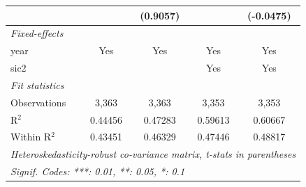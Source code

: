 \begin{tabular}{lcccc}
                     &                & (0.9057)       &                & (-0.0475)\\   
   \midrule
   \emph{Fixed-effects}\\
   year              & Yes            & Yes            & Yes            & Yes\\  
   sic2              &                &                & Yes            & Yes\\  
   \midrule
   \emph{Fit statistics}\\
   Observations      & 3,363          & 3,363          & 3,353          & 3,353\\  
   R$^2$             & 0.44456        & 0.47283        & 0.59613        & 0.60667\\  
   Within R$^2$      & 0.43451        & 0.46329        & 0.47446        & 0.48817\\  
   \midrule \midrule
   \multicolumn{5}{l}{\emph{Heteroskedasticity-robust co-variance matrix, t-stats in parentheses}}\\
   \multicolumn{5}{l}{\emph{Signif. Codes: ***: 0.01, **: 0.05, *: 0.1}}\\
\end{tabular}
\par\endgroup


